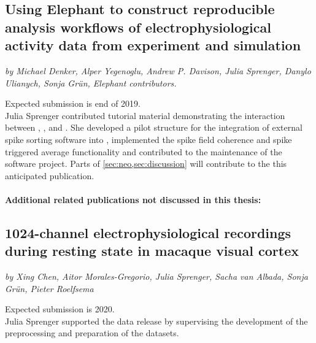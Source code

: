 \clearpage
\subsection*{Using Elephant to construct reproducible analysis workflows of electrophysiological activity data from experiment and simulation}
\textit{by Michael Denker, Alper Yegenoglu, Andrew P. Davison, Julia Sprenger, Danylo Ulianych, Sonja Grün, Elephant contributors.}

Expected submission is end of 2019.\\

Julia Sprenger contributed tutorial material demonstrating the interaction between , ,  and . She developed a pilot structure for the integration of external spike sorting software into , implemented the spike field coherence and spike triggered average functionality and contributed to the maintenance of the software project. Parts of \cref{sec:neo,sec:discussion} will contribute to the this anticipated publication.\\

\vspace{2cm}

\paragraph{Additional related publications not discussed in this thesis:}
\subsection*{1024-channel electrophysiological recordings during resting state in macaque visual cortex}
\textit{by Xing Chen, Aitor Morales-Gregorio, Julia Sprenger, Sacha van Albada, Sonja Grün, Pieter Roelfsema}

Expected submission is 2020.\\

Julia Sprenger supported the data release by supervising the development of the preprocessing and preparation of the datasets.

\hypersetup{pageanchor=true} %
